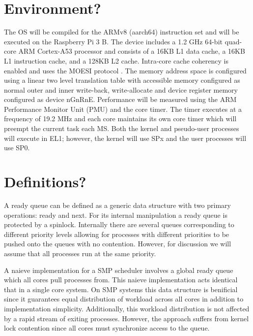 \documentclass[11pt]{article}
\begin{document}
\section{Environment?}
\label{sec:environment?}
The OS will be compiled for the ARMv8 (aarch64) instruction set and will be executed on the Raspberry Pi 3 B.  The device includes a 1.2 GHz 64-bit quad-core ARM Cortex-A53 processor and consists of a 16KB L1 data cache, a 16KB L1 instruction cache, and a 128KB L2 cache.  Intra-core cache coherency is enabled and uses the MOESI protocol \cite{arm-dcache-coherency}.  The memory address space is configured using a linear two level translation table with accessible memory configured as normal outer and inner write-back, write-allocate and device register memory configured as device nGnRnE.  Performance will be measured using the ARM Performance Monitor Unit (PMU) and the core timer.  The timer executes at a frequency of 19.2 MHz \cite{bcm2386} and each core maintains its own core timer which will preempt the current task each MS.  Both the kernel and pseudo-user processes will execute in EL1; however, the kernel will use SPx and the user processes will use SP0.

\section{Definitions?}
\label{sec:definitions?}

A ready queue can be defined as a generic data structure with two primary operations: ready and next.  For its internal manipulation a ready queue is protected by a spinlock.  Internally there are several queues corresponding to different priority levels allowing for processes with different priorities to be pushed onto the queues with no contention.  However, for discussion we will assume that all processes run at the same priority.

A naieve implementation for a SMP scheduler involves a global ready queue which all cores pull processes from.  This naieve implementation acts identical that in a single core system.  On SMP systems this data structure is benificial since it guarantees equal distribution of workload across all cores in addition to implementation simplicity.  Additionally, this workload distribution is not affected by a rapid stream of exiting processes.  However, the approach suffers from kernel lock contention since all cores must synchronize access to the queue.
\end{document}

